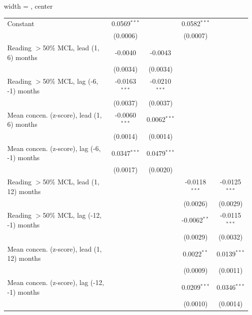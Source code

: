\begin{table}[htbp]
\begin{adjustbox}{width = \textwidth, center}
\begin{tabular}{lcccc}
         \midrule 
         Constant                                     & 0.0569$^{***}$  &                 & 0.0582$^{***}$  &   \\   
                                                      & (0.0006)        &                 & (0.0007)        &   \\   
         Reading $>$50\% MCL, lead (1, 6) months      & -0.0040         & -0.0043         &                 &   \\   
                                                      & (0.0034)        & (0.0034)        &                 &   \\   
         Reading $>$50\% MCL, lag (-6, -1) months     & -0.0163$^{***}$ & -0.0210$^{***}$ &                 &   \\   
                                                      & (0.0037)        & (0.0037)        &                 &   \\   
         Mean concen. (z-score), lead (1, 6) months   & -0.0060$^{***}$ & 0.0062$^{***}$  &                 &   \\   
                                                      & (0.0014)        & (0.0014)        &                 &   \\   
         Mean concen. (z-score), lag (-6, -1) months  & 0.0347$^{***}$  & 0.0479$^{***}$  &                 &   \\   
                                                      & (0.0017)        & (0.0020)        &                 &   \\   
         Reading $>$50\% MCL, lead (1, 12) months     &                 &                 & -0.0118$^{***}$ & -0.0125$^{***}$\\   
                                                      &                 &                 & (0.0026)        & (0.0029)\\   
         Reading $>$50\% MCL, lag (-12, -1) months    &                 &                 & -0.0062$^{**}$  & -0.0115$^{***}$\\   
                                                      &                 &                 & (0.0029)        & (0.0032)\\   
         Mean concen. (z-score), lead (1, 12) months  &                 &                 & 0.0022$^{**}$   & 0.0139$^{***}$\\   
                                                      &                 &                 & (0.0009)        & (0.0011)\\   
         Mean concen. (z-score), lag (-12, -1) months &                 &                 & 0.0209$^{***}$  & 0.0346$^{***}$\\   
                                                      &                 &                 & (0.0010)        & (0.0014)\\   
         

\end{tabular}
\end{adjustbox}
\end{table}
